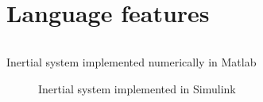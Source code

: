 \documentclass[\rootfolder/main.tex]{subfiles}
\begin{document}
\section{Language features}

\begin{listing}[ht]
    \inputminted[fontsize=\footnotesize, firstline=1, lastline=8]{matlab}{\rootfolder/Models/Matlab/InertialMatlab.m}
    \caption{Inertial system implemented numerically in Matlab}
\end{listing}

\begin{figure}[ht]
    \caption{Inertial system implemented in Simulink}
    \label{fig:inertial-simulink}
\end{figure}
\end{document}
